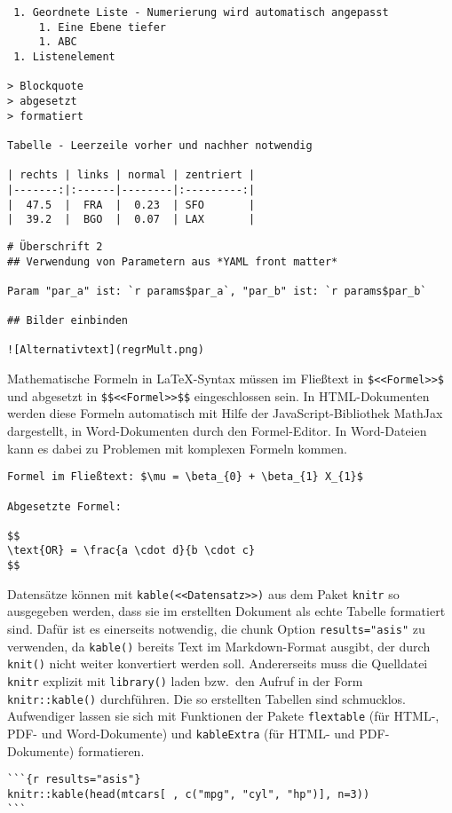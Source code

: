 \begin{lstlisting}
 1. Geordnete Liste - Numerierung wird automatisch angepasst
     1. Eine Ebene tiefer
     1. ABC
 1. Listenelement

> Blockquote
> abgesetzt
> formatiert

Tabelle - Leerzeile vorher und nachher notwendig

| rechts | links | normal | zentriert |
|-------:|:------|--------|:---------:|
|  47.5  |  FRA  |  0.23  | SFO       |
|  39.2  |  BGO  |  0.07  | LAX       |
\end{lstlisting}

\begin{lstlisting}
# Überschrift 2
## Verwendung von Parametern aus *YAML front matter*

Param "par_a" ist: `r params$par_a`, "par_b" ist: `r params$par_b`

## Bilder einbinden

![Alternativtext](regrMult.png)
\end{lstlisting}

Mathematische Formeln in \LaTeX-Syntax müssen im Fließtext in \lstinline!$<<Formel>>$! und abgesetzt in \lstinline!$$<<Formel>>$$! eingeschlossen sein. In HTML-Dokumenten werden diese Formeln automatisch mit Hilfe der JavaScript-Bibliothek MathJax dargestellt, in Word-Dokumenten durch den Formel-Editor. In Word-Dateien kann es dabei zu Problemen mit komplexen Formeln kommen.
\begin{lstlisting}
Formel im Fließtext: $\mu = \beta_{0} + \beta_{1} X_{1}$

Abgesetzte Formel:

$$
\text{OR} = \frac{a \cdot d}{b \cdot c}
$$
\end{lstlisting}

Datensätze können mit \lstinline!kable(<<Datensatz>>)! aus dem Paket \lstinline!knitr! so ausgegeben werden, dass sie im erstellten Dokument als echte Tabelle formatiert sind. Dafür ist es einerseits notwendig, die chunk Option \lstinline!results="asis"! zu verwenden, da \lstinline!kable()! bereits Text im Markdown-Format ausgibt, der durch \lstinline!knit()! nicht weiter konvertiert werden soll. Andererseits muss die Quelldatei \lstinline!knitr! explizit mit \lstinline!library()! laden bzw.\ den Aufruf in der Form \lstinline!knitr::kable()! durchführen. Die so erstellten Tabellen sind schmucklos. Aufwendiger lassen sie sich mit Funktionen der Pakete  \lstinline!flextable! \cite{Gohel2019} (für HTML-, PDF- und Word-Dokumente) und  \lstinline!kableExtra! \cite{Zhu2019} (für HTML- und PDF-Dokumente) formatieren.
\begin{lstlisting}
```{r results="asis"}
knitr::kable(head(mtcars[ , c("mpg", "cyl", "hp")], n=3))
```
\end{lstlisting}

